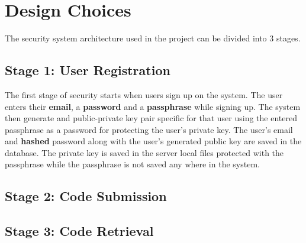 \chapter{Design Choices}

The security system architecture used in the project can be divided into 3 stages.

\section{Stage 1: User Registration}

The first stage of security starts when users sign up on the system. The user enters their \textbf{email}, a \textbf{password} and a \textbf{passphrase} while signing up. The system then generate and public-private key pair specific for that user using the entered passphrase as a password for protecting the user's private key. The user's email and \textbf{hashed} password along with the user's generated public key are saved in the database. The private key is saved in the server local files protected with the passphrase while the passphrase is not saved any where in the system.

\section{Stage 2: Code Submission}

\section{Stage 3: Code Retrieval}